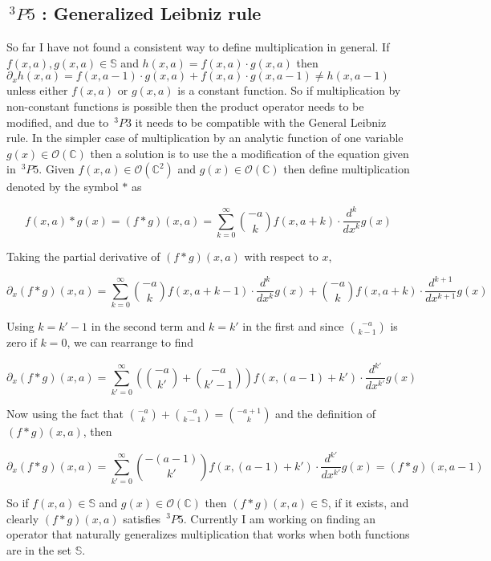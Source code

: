 \documentclass[%
 onecolumn,
 amsmath, amssymb, aps, pra, 10pt
]{revtex4-2}
\begin{document}
\subsection*{$\,^3P5$ : Generalized Leibniz rule}
So far I have not found a consistent way to define multiplication in general. If $f(x, a), g(x, a) \in \mathbb{S}$ and $h(x, a) = f(x, a) \cdot g(x, a)$ then $\partial_x h(x, a) = f(x, a - 1) \cdot g(x, a) + f(x, a) \cdot g(x, a - 1) \neq h(x, a - 1)$ unless either $f(x, a)$ or $g(x, a)$ is a constant function. So if multiplication by non-constant functions is possible then the product operator needs to be modified, and due to $\,^3P3$ it needs to be compatible with the General Leibniz rule. In the simpler case of multiplication by an analytic function of one variable $g(x) \in \mathcal{O}(\mathbb{C})$ then a solution is to use the a modification of the equation given in $\,^3P5$. Given $f(x, a) \in \mathcal{O}(\mathbb{C}^2)$ and $g(x) \in \mathcal{O}(\mathbb{C})$ then define multiplication denoted by the symbol $*$ as

\begin{equation}
f(x, a) * g(x) = (f * g)(x, a) = \sum_{k=0}^{\infty} \binom{-a}{k}f(x, a + k) \cdot \frac{d^k}{dx^k} g(x)
\label{multiplication}
\end{equation}

Taking the partial derivative of $(f * g)(x, a)$ with respect to $x$,

$$\partial_x (f * g)(x, a) = \sum_{k=0}^{\infty} \binom{-a}{k}f(x, a + k - 1) \cdot \frac{d^k}{dx^k} g(x) + \binom{-a}{k}f(x, a + k) \cdot \frac{d^{k + 1}}{dx^{k + 1}} g(x)$$

Using $k = k' - 1$ in the second term and $k = k'$ in the first and since $\binom{-a}{k-1}$ is zero if $k=0$, we can rearrange to find

$$\partial_x (f * g)(x, a) = \sum_{k'=0}^{\infty} \left( \binom{-a}{k'} + \binom{-a}{k' - 1} \right)f(x, (a - 1) + k') \cdot \frac{d^{k'}}{dx^{k'}} g(x)$$

Now using the fact that $\binom{-a}{k} + \binom{-a}{k - 1} = \binom{-a + 1}{k}$ and the definition of $(f * g)(x, a)$, then 

$$\partial_x (f * g)(x, a) = \sum_{k'=0}^{\infty} \binom{-(a - 1)}{k'}f(x, (a - 1) + k') \cdot \frac{d^{k'}}{dx^{k'}} g(x) = (f * g)(x, a - 1)$$

So if $f(x, a) \in \mathbb{S}$ and $g(x) \in \mathcal{O}(\mathbb{C})$ then $(f * g)(x, a) \in \mathbb{S}$, if it exists, and clearly $(f * g)(x, a)$ satisfies $\,^3P5$. Currently I am working on finding an operator that naturally generalizes multiplication that works when both functions are in the set $\mathbb{S}$.
\end{document}
